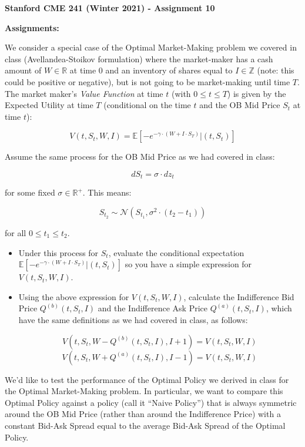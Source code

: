 \documentclass[12pt]{exam}
\begin{document}
\begin{center}
{\large {\bf Stanford CME 241 (Winter 2021) - Assignment 10}}
\end{center}
 
{\large{\bf Assignments:}}
\begin{questions}
 We consider a special case of the Optimal Market-Making problem we covered in class (Avellandea-Stoikov formulation) where the market-maker has a cash amount of $W \in \mathbb{R}$ at time 0 and an inventory of shares equal to $I \in \mathbb{Z}$ (note: this could be positive or negative), but is not going to be market-making until time $T$. The market maker's {\em Value Function} at time $t$ (with $0 \leq t \leq T$) is given by the Expected Utility at time $T$ (conditional on the time $t$ and the OB Mid Price $S_t$ at time $t$):

$$V(t, S_t, W, I) = \mathbb{E}[-e^{-\gamma \cdot (W + I \cdot S_T)} | (t, S_t)]$$

Assume the same process for the OB Mid Price as we had covered in class:

$$dS_t = \sigma \cdot dz_t$$

for some fixed $\sigma \in \mathbb{R}^+$. This means:

$$S_{t_2} \sim \mathcal{N}(S_{t_1}, \sigma^2 \cdot (t_2 - t_1))$$

for all $0 \leq t_1 \leq t_2$.

\begin{itemize}
\item Under this process for $S_t$, evaluate the conditional expectation $\mathbb{E}[-e^{-\gamma \cdot (W + I \cdot S_T)} | (t, S_t)]$ so you have a simple expression for $V(t, S_t, W, I)$.
\item Using the above expression for $V(t, S_t, W, I)$, calculate the Indifference Bid Price $Q^{(b)}(t, S_t, I)$ and the Indifference Ask Price $Q^{(a)}(t,S_t,I)$, which have the same definitions as we had covered in class, as follows:

$$V(t,S_t,W - Q^{(b)}(t, S_t, I), I + 1) = V(t,S_t,W, I)$$
$$V(t,S_t,W + Q^{(a)}(t, S_t, I), I - 1) = V(t,S_t,W, I)$$
\end{itemize}

\question We'd like to test the performance of the Optimal Policy we derived in class for the Optimal Market-Making problem. In particular, we want to compare this Optimal Policy against a policy (call it ``Naive Policy'') that is always symmetric around the OB Mid Price (rather than around the Indifference Price) with a constant Bid-Ask Spread equal to the average Bid-Ask Spread of the Optimal Policy.


\end{questions}
\end{document}
